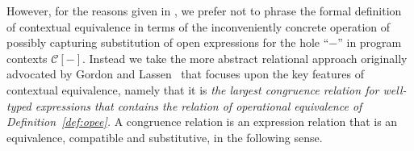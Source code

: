 \documentclass{LMCS}
\theoremstyle{plain}
\theoremstyle{definition}
\newcommand{\atm}[1][a]{#1}
\newcommand{\ATM}{\kw{atm}}
\newcommand{\BINDTY}{\kw{bnd}}
\newcommand{\BINDVAL}[2]{\mathopen{\text{\normalfont\guillemotleft}}#1
  \mathclose{\text{\normalfont\guillemotright}}#2}
\newcommand{\CON}[1][C]{\kw{#1}}
\newcommand{\CR}[1]{\mathrel{\widehat{#1}}}
\newcommand{\dty}{\delta}
\newcommand{\ent}{\vdash}
\newcommand{\EQ}{\mathbin{\kw{=}}}
\newcommand{\er}{\mathrel{\mathcal{E}}}
\renewcommand{\exp}[1][e]{#1}
\newcommand{\FST}{\kw{fst}}
\newcommand{\FUN}{\kw{fun}}
\newcommand{\FUNTY}{\mathbin{\rightarrow}}
\newcommand{\IN}{\mathrel{\kw{in}}}
\newcommand{\LET}{\mathop{\kw{let}}}
\newcommand{\LP}{\mathopen{\kw{(}}}
\newcommand{\kw}[1]{\mathsf{#1}}
\newcommand{\ofty}{:}
\newcommand{\OFTY}{\mathrel{\kw{:}}}
\newcommand{\PRODTY}{\mathbin{\kw{*}}}
\newcommand{\RP}{\mathclose{\kw{)}}}
\newcommand{\ty}{\tau}
\newcommand{\UNIT}{\kw{unit}}
\newcommand{\UNITVAL}{\LP\RP}
\newcommand{\val}[1][v]{#1}
\newcommand{\vid}[1][x]{#1}
\newcommand{\w}[1][w]{#1}
\begin{document}
However, for the reasons given in \cite[Section~7.5]{PittsAM:typor},
we prefer not to phrase the formal definition of contextual
equivalence in terms of the inconveniently concrete operation of
possibly capturing substitution of open expressions for the hole
``$-$'' in program contexts $\mathcal{C}[-]$.  Instead we take the
more abstract relational approach originally advocated by
Gordon \cite{GordonAD:opeeup} and Lassen~\cite{LassenS:relrac} that
focuses upon the key features of contextual equivalence, namely that
it is \emph{the largest congruence relation for well-typed expressions
  that contains the relation of operational equivalence of
  Definition~\ref{def:opee}.} A congruence relation is an expression
relation that is an equivalence, compatible and substitutive, in the
following sense.

\begin{figure}\small
    \centering 
\end{figure}
\end{document}
